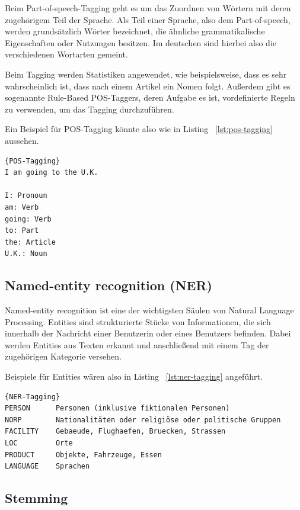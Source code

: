 Beim Part-of-speech-Tagging geht es um das Zuordnen von Wörtern mit deren zugehörigem Teil der Sprache.
Als Teil einer Sprache, also dem Part-of-speech, werden grundsätzlich Wörter bezeichnet, die ähnliche grammatikalische Eigenschaften oder Nutzungen besitzen.
Im deutschen sind hierbei also die verschiedenen Wortarten gemeint.

Beim Tagging werden Statistiken angewendet, wie beispielsweise, dass es sehr wahrscheinlich ist, dass nach einem Artikel ein Nomen folgt.
Außerdem gibt es sogenannte Rule-Based POS-Taggers, deren Aufgabe es ist, vordefinierte Regeln zu verwenden, um das Tagging durchzuführen.\cite{machineLearningTextAnalysis, naturalLanguageProcessing}

Ein Beispiel für POS-Tagging könnte also wie in Listing ~\ref{lst:pos-tagging} aussehen.

\begin{lstlisting}[label={lst:pos-tagging},caption={Beispiel für POS-Tagging}]{POS-Tagging}
I am going to the U.K.

I: Pronoun
am: Verb
going: Verb
to: Part
the: Article
U.K.: Noun
\end{lstlisting}

\subsection{Named-entity recognition (NER)}\label{subsec:ner}

Named-entity recognition ist eine der wichtigsten Säulen von Natural Language Processing.
Entities sind strukturierte Stücke von Informationen, die sich innerhalb der Nachricht einer Benutzerin oder eines Benutzers befinden.
Dabei werden Entities aus Texten erkannt und anschließend mit einem Tag der zugehörigen Kategorie versehen.\cite{namedEntityRecognition}

Beispiele für Entities wären also in Listing ~\ref{lst:ner-tagging} angeführt.

\begin{lstlisting}[label={lst:ner-tagging},caption={Beispiele für Enitites}]{NER-Tagging}
PERSON      Personen (inklusive fiktionalen Personen)
NORP        Nationalitäten oder religiöse oder politische Gruppen
FACILITY    Gebaeude, Flughaefen, Bruecken, Strassen
LOC         Orte
PRODUCT     Objekte, Fahrzeuge, Essen
LANGUAGE    Sprachen
\end{lstlisting}

\subsection{Stemming}\label{subsec:stemming}

